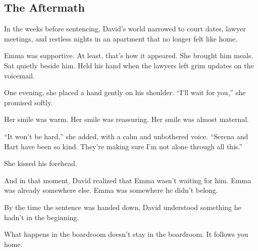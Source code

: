 \subsection{The Aftermath}

In the weeks before sentencing, David’s world narrowed to court dates, lawyer meetings, and restless 
nights in an apartment that no longer felt like home.

Emma was supportive. At least, that’s how it appeared.  
She brought him meals. Sat quietly beside him. Held his hand when the lawyers left grim updates on the voicemail.

One evening, she placed a hand gently on his shoulder.  
“I’ll wait for you,” she promised softly.  

Her smile was warm. Her smile was reassuring. Her smile was almost maternal.  

“It won’t be hard,” she added, with a calm and unbothered voice.
“Serena and Hart have been so kind. They’re making sure I’m not alone through all this.”

She kissed his forehead.

And in that moment, David realized that 
Emma wasn’t waiting for him.  
Emma was already somewhere else.  
Emma was somewhere he didn't belong.

By the time the sentence was handed down,  
David understood something he hadn’t in the beginning. 

What happens in the boardroom doesn't stay in the boardroom.  It follows you home.

\medskip

